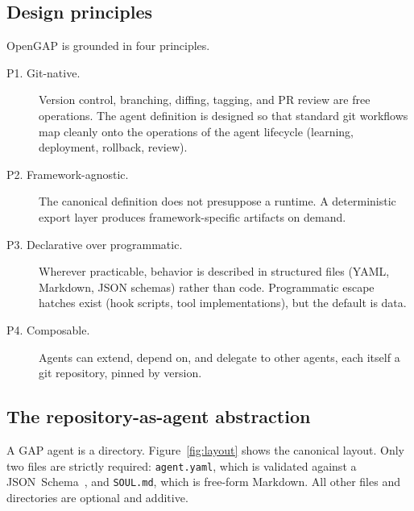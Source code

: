 \documentclass[11pt,a4paper]{article}
\begin{document}
\subsection{Design principles}

OpenGAP is grounded in four principles.

\begin{description}
  \item[P1. Git-native.] Version control, branching, diffing, tagging, and PR review are
  free operations. The agent definition is designed so that standard git workflows map
  cleanly onto the operations of the agent lifecycle (learning, deployment, rollback,
  review).
  \item[P2. Framework-agnostic.] The canonical definition does not presuppose a runtime.
  A deterministic export layer produces framework-specific artifacts on demand.
  \item[P3. Declarative over programmatic.] Wherever practicable, behavior is described
  in structured files (YAML, Markdown, JSON schemas) rather than code. Programmatic
  escape hatches exist (hook scripts, tool implementations), but the default is
  data.
  \item[P4. Composable.] Agents can extend, depend on, and delegate to other agents,
  each itself a git repository, pinned by version.
\end{description}

\subsection{The repository-as-agent abstraction}\label{sec:repo-as-agent}

A GAP agent is a directory. Figure~\ref{fig:layout} shows the canonical layout. Only
two files are strictly required: \texttt{agent.yaml}, which is validated against a
JSON~Schema~\cite{schema2020}, and \texttt{SOUL.md}, which is free-form Markdown.
All other files and directories are optional and additive.
\end{document}
